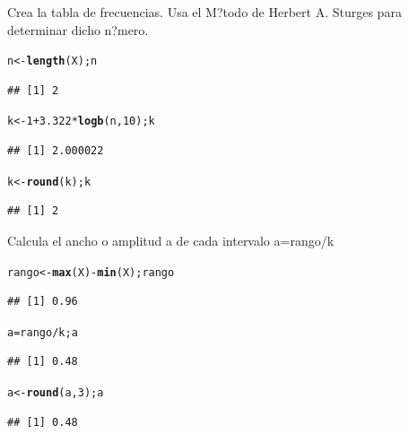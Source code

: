 \documentclass[10pt,a4paper]{article}\usepackage[]{graphicx}\usepackage[]{color}
\makeatletter
\newcommand{\hlnum}[1]{\textcolor[rgb]{0.686,0.059,0.569}{#1}}%
\newcommand{\hlopt}[1]{\textcolor[rgb]{0,0,0}{#1}}%
\newcommand{\hlstd}[1]{\textcolor[rgb]{0.345,0.345,0.345}{#1}}%
\newcommand{\hlkwb}[1]{\textcolor[rgb]{0.69,0.353,0.396}{#1}}%
\newcommand{\hlkwd}[1]{\textcolor[rgb]{0.737,0.353,0.396}{\textbf{#1}}}%
\newenvironment{kframe}{%
 \def\at@end@of@kframe{}%
 \ifinner\ifhmode%
  \def\at@end@of@kframe{\end{minipage}}%
  \begin{minipage}{\columnwidth}%
 \fi\fi%
 \def\FrameCommand##1{\hskip\@totalleftmargin \hskip-\fboxsep
 \colorbox{shadecolor}{##1}\hskip-\fboxsep
     \hskip-\linewidth \hskip-\@totalleftmargin \hskip\columnwidth}%
 \MakeFramed {\advance\hsize-\width
   \@totalleftmargin\z@ \linewidth\hsize
   \@setminipage}}%
 {\par\unskip\endMakeFramed%
 \at@end@of@kframe}
\newenvironment{knitrout}{}{} %
\makeatother
\begin{document}
Crea la tabla de frecuencias. 
Usa el M?todo de Herbert A. Sturges para determinar dicho n?mero. 
\begin{knitrout}
\color{fgcolor}\begin{kframe}
\begin{alltt}
\hlstd{n} \hlkwb{<-} \hlkwd{length}\hlstd{(X); n}
\end{alltt}
\begin{verbatim}
## [1] 2
\end{verbatim}
\begin{alltt}
\hlstd{k} \hlkwb{<-} \hlnum{1}\hlopt{+}\hlnum{3.322}\hlopt{*}\hlkwd{logb}\hlstd{(n,} \hlnum{10}\hlstd{); k}
\end{alltt}
\begin{verbatim}
## [1] 2.000022
\end{verbatim}
\begin{alltt}
\hlstd{k} \hlkwb{<-} \hlkwd{round}\hlstd{(k); k}
\end{alltt}
\begin{verbatim}
## [1] 2
\end{verbatim}
\end{kframe}
\end{knitrout}

Calcula el ancho o amplitud a de cada intervalo a=rango/k 
\begin{knitrout}
\color{fgcolor}\begin{kframe}
\begin{alltt}
\hlstd{rango} \hlkwb{<-} \hlkwd{max}\hlstd{(X)}\hlopt{-}\hlkwd{min}\hlstd{(X); rango}
\end{alltt}
\begin{verbatim}
## [1] 0.96
\end{verbatim}
\begin{alltt}
\hlstd{a}\hlkwb{=}\hlstd{rango}\hlopt{/}\hlstd{k; a}
\end{alltt}
\begin{verbatim}
## [1] 0.48
\end{verbatim}
\begin{alltt}
\hlstd{a} \hlkwb{<-} \hlkwd{round}\hlstd{(a,} \hlnum{3}\hlstd{); a}
\end{alltt}
\begin{verbatim}
## [1] 0.48
\end{verbatim}
\end{kframe}
\end{knitrout}
\end{document}

